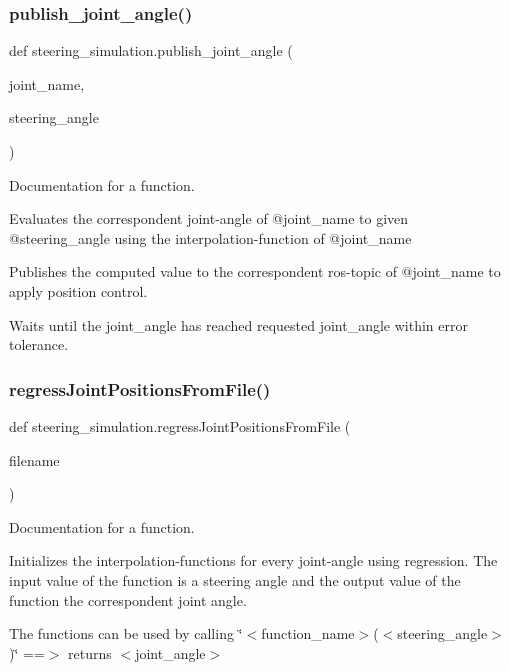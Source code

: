 \subsubsection{\texorpdfstring{publish\_joint\_angle()}{publish\_joint\_angle()}}
{\footnotesize\ttfamily def steering\+\_\+simulation.\+publish\+\_\+joint\+\_\+angle (\begin{DoxyParamCaption}\item[{}]{joint\+\_\+name,  }\item[{}]{steering\+\_\+angle }\end{DoxyParamCaption})}



Documentation for a function. 

Evaluates the correspondent joint-\/angle of @joint\+\_\+name to given @steering\+\_\+angle using the interpolation-\/function of @joint\+\_\+name

Publishes the computed value to the correspondent ros-\/topic of @joint\+\_\+name to apply position control.

Waits until the joint\+\_\+angle has reached requested joint\+\_\+angle within error tolerance. \mbox{\label{namespacesteering__simulation_a3bdf7d63620ec8e0a63d41324b1cdaa4}} 
\subsubsection{\texorpdfstring{regressJointPositionsFromFile()}{regressJointPositionsFromFile()}}
{\footnotesize\ttfamily def steering\+\_\+simulation.\+regress\+Joint\+Positions\+From\+File (\begin{DoxyParamCaption}\item[{}]{filename }\end{DoxyParamCaption})}



Documentation for a function. 

Initializes the interpolation-\/functions for every joint-\/angle using regression. The input value of the function is a steering angle and the output value of the function the correspondent joint angle.

The functions can be used by calling \char`\"{}$<$function\+\_\+name$>$($<$steering\+\_\+angle$>$)\char`\"{} ==$>$ returns $<$joint\+\_\+angle$>$ \mbox{\label{namespacesteering__simulation_a787fcfa65451a11a9f94afaea6a6e809}} 
